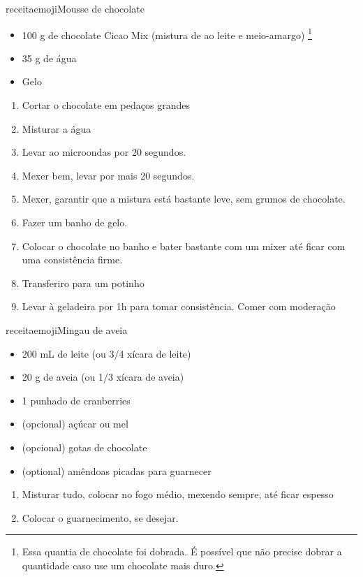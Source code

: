 receitaemoji{Mousse de chocolate\checkmark}{
		\begin{itemize}
			\item 100 g de chocolate Cicao Mix (mistura de ao leite e meio-amargo)
			      \footnote{Essa quantia de chocolate foi dobrada. É possível que não precise
				      dobrar a quantidade caso use um chocolate mais duro.}
			\item 35 g de água
			\item Gelo
		\end{itemize}
	}{
		\begin{enumerate}
			\item Cortar o chocolate em pedaços grandes
			\item Misturar a água
			\item Levar ao microondas por 20 segundos.
			\item Mexer bem, levar por mais 20 segundos.
			\item Mexer, garantir que a mistura está bastante leve, sem grumos de
			      chocolate.
			\item Fazer um banho de gelo.
			\item  Colocar o chocolate no banho e bater bastante
			      com um mixer até ficar com uma consistência firme.
			\item Transferiro para um potinho
			\item Levar à geladeira por 1h para tomar consistência. Comer com moderação
		\end{enumerate}
	}

receitaemoji{Mingau de aveia\checkmark}{
		\begin{itemize}
			\item 200 mL de leite (ou 3/4 xícara de leite)
			\item 20 g de aveia   (ou 1/3 xícara de aveia)
			\item 1 punhado de cranberries
			\item (opcional) açúcar ou mel
			\item (opcional) gotas de chocolate
			\item (optional) amêndoas picadas para guarnecer
		\end{itemize}
	}{
		\begin{enumerate}
			\item Misturar tudo, colocar no fogo médio, mexendo sempre, até ficar espesso
			\item Colocar o guarnecimento, se desejar.
		\end{enumerate}
	}

